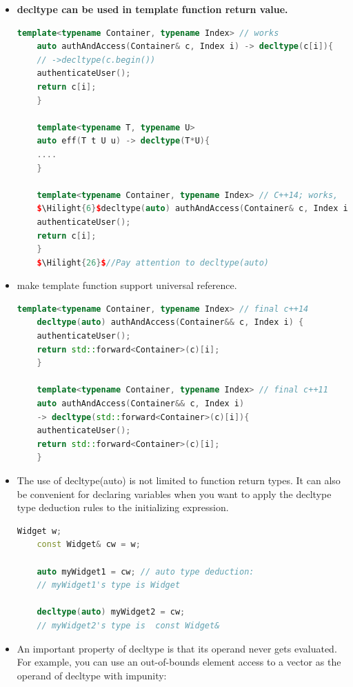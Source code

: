 \documentclass[a4paper,12pt,twoside]{book}
\newcommand{\Hilight}[1]{\makebox[0pt][l]{\color{yellow}\rule[-3pt]{#1em}{11pt}}}
\begin{document}
\begin{itemize}
\begin{enumerate}
	\end{enumerate}
	
	\item \textbf{decltype can be used in template function return value.}
	\begin{lstlisting}[frame=single, language=c++, mathescape=true]
	template<typename Container, typename Index> // works
	auto authAndAccess(Container& c, Index i) -> decltype(c[i]){
	// ->decltype(c.begin())
	authenticateUser();
	return c[i];
	}
	
	template<typename T, typename U>
	auto eff(T t U u) -> decltype(T*U){
	....
	}
	
	template<typename Container, typename Index> // C++14; works,
	$\Hilight{6}$decltype(auto) authAndAccess(Container& c, Index i) {
	authenticateUser();
	return c[i];
	}
	$\Hilight{26}$//Pay attention to decltype(auto)
	\end{lstlisting}
	
	\item make template function support universal reference.
	\begin{lstlisting}[frame=single, language=c++, mathescape=true]
	template<typename Container, typename Index> // final c++14
	decltype(auto) authAndAccess(Container&& c, Index i) {
	authenticateUser();
	return std::forward<Container>(c)[i];
	}
	
	template<typename Container, typename Index> // final c++11
	auto authAndAccess(Container&& c, Index i)
	-> decltype(std::forward<Container>(c)[i]){
	authenticateUser();
	return std::forward<Container>(c)[i];
	}
	\end{lstlisting}
	
	\item The use of decltype(auto) is not limited to function return types. It can also be convenient for declaring variables when you want to apply the decltype type deduction rules to the initializing expression.
	\begin{lstlisting}[frame=single, language=c++, mathescape=true]
	Widget w;
	const Widget& cw = w;
	
	auto myWidget1 = cw; // auto type deduction:
	// myWidget1's type is Widget
	
	decltype(auto) myWidget2 = cw;
	// myWidget2's type is  const Widget&
	\end{lstlisting}
	
	\item An important property of decltype is that its operand never gets evaluated. For example, you can use an out-of-bounds element access to a vector as the operand of decltype with impunity:
	

\end{itemize}
\end{document}
